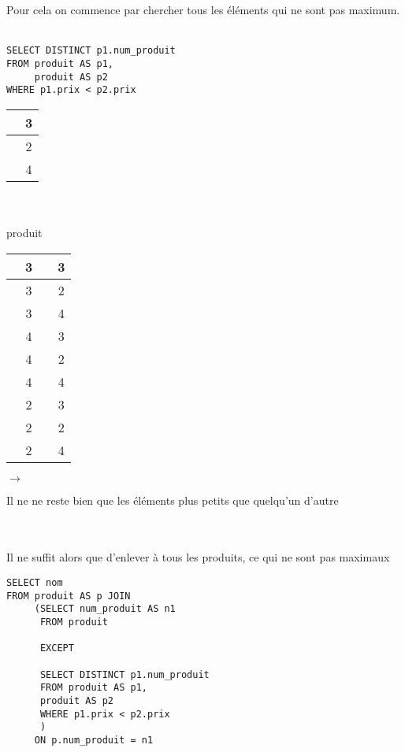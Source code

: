 Pour cela on commence par chercher tous les éléments qui ne sont pas maximum.
\\
\\
\begin{minipage}{0.40\linewidth}
\begin{lstlisting}
SELECT DISTINCT p1.num_produit
FROM produit AS p1,
     produit AS p2
WHERE p1.prix < p2.prix
\end{lstlisting}
\end{minipage} \quad \begin{minipage}{0.15\linewidth}
\begin{center}
\begin{tabular}{|c|c|}
	\hline
	\qquad \qquad \qquad & 3 \\
	\hline & 2 \\
	\hline & 4 \\ \hline
\end{tabular}\\ \enspace
\\
produit
\end{center}
\end{minipage}
\begin{minipage}{0.30 \linewidth}
	\begin{center}
		\begin{tabular}{|c|c|c|c|}
			\hline \rowcolor{gray} \qquad \qquad & 3 & \qquad \qquad & 3 \\ \hline
			\rowcolor{gray} & 3 &  & 2\\ \hline
			& 3 & & 4\\ \hline
			\rowcolor{gray}& 4 & & 3\\ \hline
			\rowcolor{gray}& 4 & & 2\\ \hline
			\rowcolor{gray}& 4 & & 4\\ \hline
			& 2 & & 3 \\ \hline
			\rowcolor{gray} & 2 & & 2\\ \hline
			& 2 & & 4\\ \hline
		\end{tabular}
	\end{center}
\end{minipage} $\to$ \begin{minipage}{0.15\linewidth}
Il ne ne reste bien que les éléments plus petits que quelqu'un d'autre
\end{minipage}\\
\\
Il ne suffit alors que d'enlever à tous les produits, ce qui ne sont pas maximaux
\begin{lstlisting}
SELECT nom
FROM produit AS p JOIN 
     (SELECT num_produit AS n1
      FROM produit
      
      EXCEPT
      
      SELECT DISTINCT p1.num_produit
      FROM produit AS p1,
      produit AS p2
      WHERE p1.prix < p2.prix
      )
     ON p.num_produit = n1
\end{lstlisting}

